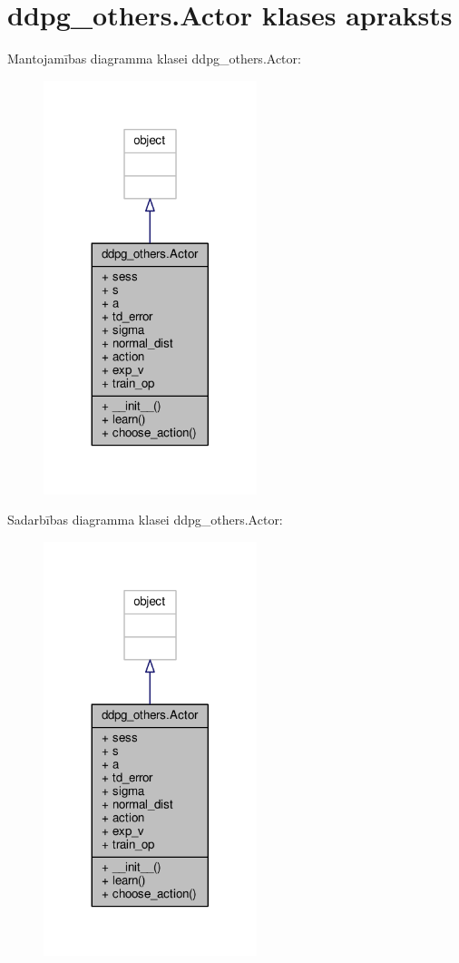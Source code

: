 \hypertarget{classddpg__others_1_1_actor}{}\section{ddpg\+\_\+others.\+Actor klases apraksts}
\label{classddpg__others_1_1_actor}


Mantojamības diagramma klasei ddpg\+\_\+others.\+Actor\+:
\nopagebreak
\begin{figure}[H]
\begin{center}
\leavevmode
\includegraphics[width=176pt]{classddpg__others_1_1_actor__inherit__graph}
\end{center}
\end{figure}


Sadarbības diagramma klasei ddpg\+\_\+others.\+Actor\+:
\nopagebreak
\begin{figure}[H]
\begin{center}
\leavevmode
\includegraphics[width=176pt]{classddpg__others_1_1_actor__coll__graph}
\end{center}
\end{figure}
